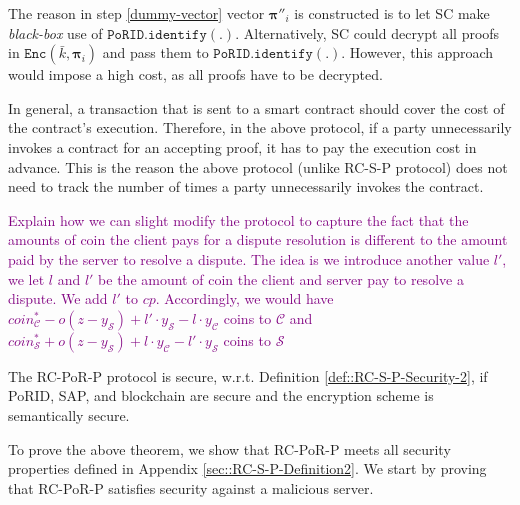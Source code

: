 \begin{remark}
The reason in step \ref{dummy-vector} vector $ {\bm{\pi}}''_{\scriptscriptstyle i}$ is constructed  is to let SC make \emph{black-box}  use of $\mathtt{PoRID.identify}(.)$. Alternatively, SC could decrypt all proofs in $\mathtt{Enc}(\bar{k}, {\bm{\pi}}_{\scriptscriptstyle i})$ and pass them to $\mathtt{PoRID.identify}(.)$. However, this approach would impose a high cost, as all proofs have to be decrypted. 
\end{remark}

\begin{remark}
In general, a transaction that is sent   to a smart contract should  cover the cost of the contract's execution. Therefore, in the above protocol, if a party unnecessarily invokes a contract for an accepting proof, it has to pay the execution cost in advance. This is the reason the above protocol (unlike RC-S-P protocol) does not need to track the number of times a party unnecessarily invokes the contract.    
\end{remark}


\begin{remark}
\textcolor{purple}{Explain how we can slight modify the protocol to capture the fact  that the amounts of coin the client pays for a dispute resolution is different to the amount paid by the server to resolve a dispute. The idea is we introduce another value $l'$, we let $l$ and $l'$ be the amount of coin the client and server pay to resolve a dispute.  We add $l'$ to $cp$. Accordingly, we would have $coin^{\scriptscriptstyle *}_{\scriptscriptstyle\mathcal C}-o(z-y_{\scriptscriptstyle\mathcal S})+l'\cdot y_{\scriptscriptstyle\mathcal S}-l\cdot y_{\scriptscriptstyle\mathcal C}$ coins  to $\mathcal C$ and  $coin^{\scriptscriptstyle *}_{\scriptscriptstyle\mathcal S}+o(z-y_{\scriptscriptstyle\mathcal S})+l\cdot y_{\scriptscriptstyle\mathcal C}-l'\cdot y_{\scriptscriptstyle\mathcal S}$ coins to $\mathcal S$}
\end{remark}


\begin{theorem}
The RC-PoR-P protocol is secure, w.r.t. Definition \ref{def::RC-S-P-Security-2}, if PoRID, SAP, and blockchain are secure and the encryption scheme is semantically secure. 
\end{theorem}



 To prove the above theorem, we show that RC-PoR-P meets all security properties defined in Appendix \ref{sec::RC-S-P-Definition2}.  We start by proving that RC-PoR-P satisfies security against a malicious server.  
 
 



%



